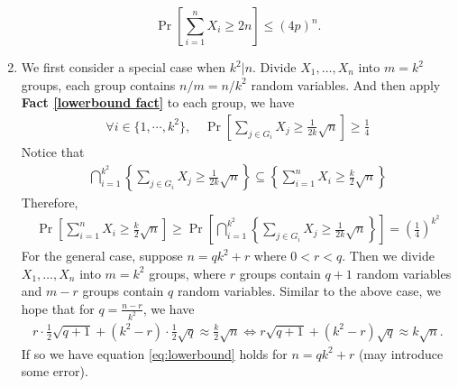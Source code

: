 \begin{answer}
\begin{enumerate}[label=\alph*).]
        \[
            \Pr\left[\sum_{i=1}^{n}X_i \ge 2n\right] \le (4p)^n.
        \]
        \item We first consider a special case when $k^2 | n$. Divide $X_1, \dots, X_n$ into $m = k^2$ groups, each group contains $n/m = n/k^2$ random variables.
        And then apply \textbf{Fact \ref{lowerbound fact}} to each group, we have
        \begin{align*}
            \forall i \in \{1, \cdots, k^2\},\quad  \Pr\left[\sum_{j\in G_i} X_j \ge \frac{1}{2k}\sqrt{n}\right] \ge \frac{1}{4} 
        \end{align*}
        Notice that 
        \begin{align*}
            \bigcap_{i=1}^{k^2} \left\{\sum_{j\in G_i} X_j \ge \frac{1}{2k}\sqrt{n}\right\} \subseteq \left\{\sum_{i=1}^{n} X_i \ge \frac{k}{2}\sqrt{n}\right\}
        \end{align*}
        Therefore,
        \begin{align}
            \label{eq:lowerbound}
            \Pr\left[\sum_{i=1}^{n} X_i \ge \frac{k}{2}\sqrt{n}\right] \ge \Pr\left[\bigcap_{i=1}^{k^2} \left\{\sum_{j\in G_i} X_j \ge \frac{1}{2k}\sqrt{n}\right\}\right] =  \left(\frac{1}{4}\right)^{k^2} 
        \end{align}
        For the general case, suppose $n = q k^2 + r$ where $0 < r < q$. Then we divide $X_1, \dots, X_n$ into $m = k^2$ groups, where $r$ groups contain $q+1$ random variables and $m-r$ groups contain $q$ random variables.
        Similar to the above case, we hope that for $q = \frac{n-r}{k^2}$, we have
        \begin{align*}
            r\cdot \frac{1}{2}\sqrt{q+1} + (k^2-r)\cdot \frac{1}{2}\sqrt{q} \approx \frac{k}{2}\sqrt{n} \iff r\sqrt{q+1} + (k^2-r)\sqrt{q} \approx k\sqrt{n}.
        \end{align*}
        If so we have equation \eqref{eq:lowerbound} holds for $n = q k^2 + r$ (may introduce some error).


\end{enumerate}
\end{answer}
